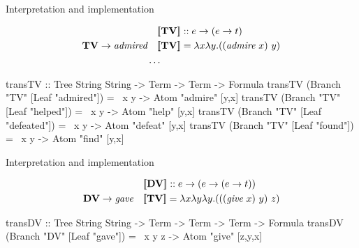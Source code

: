 \documentclass[xcolor=dvipsnames]{beamer}
\newcommand{\sem}[1]{\ensuremath{[\hspace{-1.8pt}[ #1 ]\hspace{-1.8pt}]}}
\begin{document}
\begin{frame}[fragile]{Interpretation and implementation}

\begin{align*}
&\quad \sem{\textbf{TV}} :: e\to (e\to t) \\ 
\textbf{TV} \to \text{\em admired} &\quad \sem{\textbf{TV}} = \lambda x\lambda y.((\text{\em admire}\ x)\ y) \\
& \ldots \\
\end{align*}
\begin{code}
transTV :: Tree String String -> Term -> Term -> Formula 
transTV (Branch "TV" [Leaf "admired"])  = 
                           \ x y -> Atom "admire" [y,x] 
transTV (Branch "TV" [Leaf "helped"])   = 
                           \ x y -> Atom "help"   [y,x] 
transTV (Branch "TV" [Leaf "defeated"]) = 
                           \ x y -> Atom "defeat" [y,x] 
transTV (Branch "TV" [Leaf "found"])    = 
                           \ x y -> Atom "find"   [y,x] 
\end{code}
\end{frame}

\begin{frame}[fragile]{Interpretation and implementation}

\begin{align*}
&\quad \sem{\textbf{DV}} :: e\to (e\to (e\to t)) \\
\textbf{DV} \to \text{\em gave} &\quad \sem{\textbf{TV}} = \lambda x\lambda y\lambda y.(((\text{\em give}\ x)\ y)\ z) \\
\end{align*}
\begin{code}
transDV :: Tree String String -> Term -> Term -> Term 
                                           -> Formula 
transDV (Branch "DV" [Leaf "gave"]) = 
                  \ x y z -> Atom "give" [z,y,x]
\end{code}
\end{frame}
\end{document}
